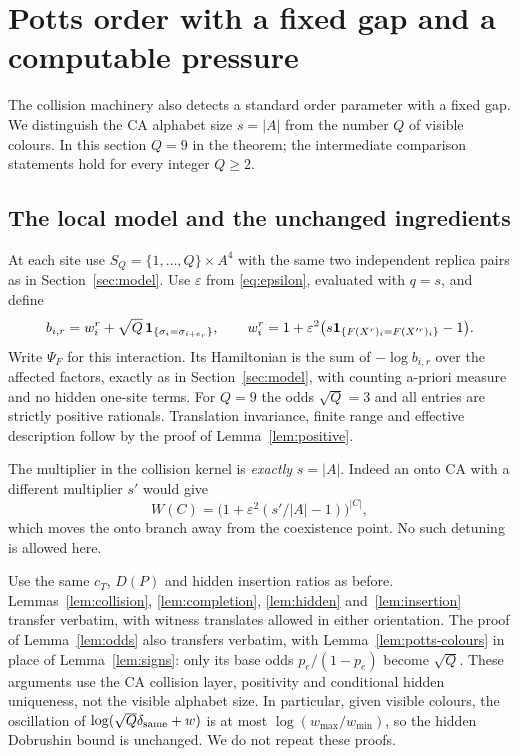 \section{Potts order with a fixed gap and a computable pressure}\label{sec:potts}
The collision machinery also detects a standard order parameter with a fixed gap. We distinguish the CA alphabet size $s=|A|$ from the number $Q$ of visible colours. In this section $Q=9$ in the theorem; the intermediate comparison statements hold for every integer $Q\ge2$.

\subsection{The local model and the unchanged ingredients}\label{sec:potts-model}
At each site use $S_Q=\{1,\ldots,Q\}\times A^4$ with the same two independent replica pairs as in Section~\ref{sec:model}. Use $\varepsilon$ from \eqref{eq:epsilon}, evaluated with $q=s$, and define
\begin{equation}\label{eq:potts-weight}
 b_{i,r}=w_i^r+\sqrt Q\,\mathbf 1_{\{\sigma_i=\sigma_{i+e_r}\}},\qquad
 w_i^r=1+\varepsilon^2\bigl(s\mathbf 1_{\{F(X^r)_i=F(X^{\prime r})_i\}}-1\bigr).
\end{equation}
Write $\Psi_F$ for this interaction. Its Hamiltonian is the sum of $-\log b_{i,r}$ over the affected factors, exactly as in Section~\ref{sec:model}, with counting a-priori measure and no hidden one-site terms. For $Q=9$ the odds $\sqrt Q=3$ and all entries are strictly positive rationals. Translation invariance, finite range and effective description follow by the proof of Lemma~\ref{lem:positive}.

The multiplier in the collision kernel is \emph{exactly} $s=|A|$. Indeed an onto CA with a different multiplier $s'$ would give
\[
 W(C)=\bigl(1+\varepsilon^2(s'/|A|-1)\bigr)^{|C|},
\]
which moves the onto branch away from the coexistence point. No such detuning is allowed here.

Use the same $c_T$, $D(P)$ and hidden insertion ratios as before. Lemmas~\ref{lem:collision}, \ref{lem:completion}, \ref{lem:hidden} and~\ref{lem:insertion} transfer verbatim, with witness translates allowed in either orientation. The proof of Lemma~\ref{lem:odds} also transfers verbatim, with Lemma~\ref{lem:potts-colours} in place of Lemma~\ref{lem:signs}: only its base odds $p_e/(1-p_e)$ become $\sqrt Q$. These arguments use the CA collision layer, positivity and conditional hidden uniqueness, not the visible alphabet size. In particular, given visible colours, the oscillation of $\log(\sqrt Q\delta_{\rm same}+w)$ is at most $\log(w_{\max}/w_{\min})$, so the hidden Dobrushin bound is unchanged. We do not repeat these proofs.


